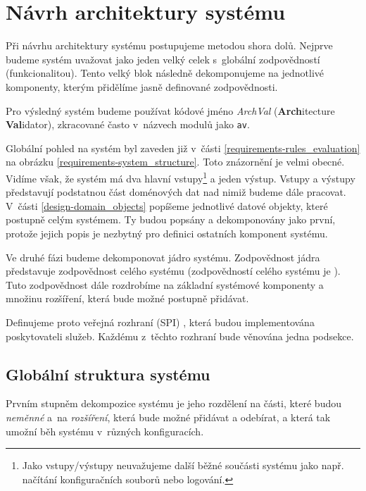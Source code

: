 \section{Návrh architektury systému}
\label{design-architecture}

Při návrhu architektury systému postupujeme metodou shora dolů. Nejprve budeme systém uvažovat jako jeden velký celek s~globální zodpovědností (funkcionalitou). Tento velký blok následně dekomponujeme na jednotlivé komponenty, kterým přidělíme jasně definované zodpovědnosti.

Pro výsledný systém budeme používat kódové jméno \emph{ArchVal} (\textbf{Arch}itecture \textbf{Val}idator), zkracované často v~názvech modulů jako \verb+av+.

Globální pohled na systém byl zaveden již v~části \ref{requirements-rules_evaluation} na obrázku \ref{requirements-system_structure}. Toto znázornění je velmi obecné. Vidíme však, že systém má dva hlavní vstupy\footnote{Jako vstupy/výstupy neuvažujeme další běžné součásti systému jako např. načítání konfiguračních souborů nebo logování.} a jeden výstup. Vstupy a výstupy představují podstatnou část doménových dat nad nimiž budeme dále pracovat. V~části \ref{design-domain_objects} popíšeme jednotlivé datové objekty, které postupně  celým systémem. Ty budou popsány a dekomponovány jako první, protože jejich popis je nezbytný pro definici ostatních komponent systému.

Ve druhé fázi budeme dekomponovat jádro systému. Zodpovědnost jádra představuje zodpovědnost celého systému (zodpovědností celého systému je ). Tuto zodpovědnost dále rozdrobíme na základní systémové komponenty a množinu rozšíření, která bude možné postupně přidávat.

Definujeme proto veřejná rozhraní (SPI) \cite{spi}, která budou implementována poskytovateli služeb. Každému z~těchto rozhraní bude věnována jedna podsekce.

\subsection{Globální struktura systému}
\label{desing-global_system_structure}

Prvním stupněm dekompozice systému je jeho rozdělení na části, které budou \emph{neměnné} a~na \emph{rozšíření}, která bude možné přidávat a odebírat, a která tak umožní běh systému v~různých konfiguracích.

